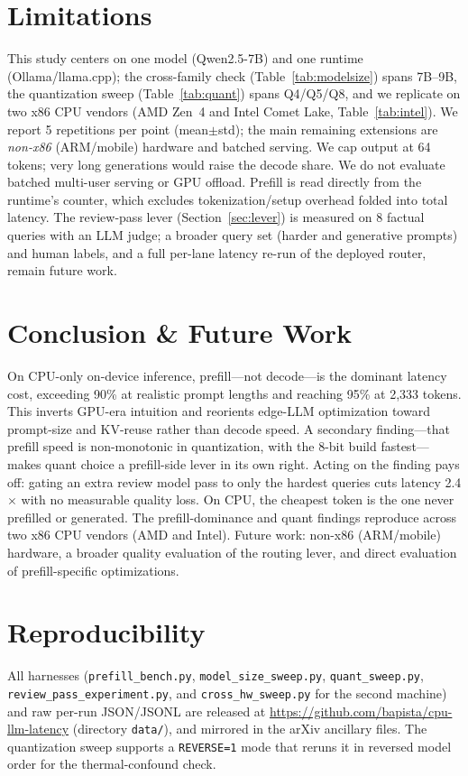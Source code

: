 \documentclass[10pt,twocolumn]{article}
\begin{document}
\section{Limitations}
\label{sec:limitations}
This study centers on one model (Qwen2.5-7B) and one runtime
(Ollama/llama.cpp); the cross-family check (Table~\ref{tab:modelsize}) spans
7B--9B, the quantization sweep (Table~\ref{tab:quant}) spans Q4/Q5/Q8, and we
replicate on two x86 CPU vendors (AMD Zen~4 and Intel Comet Lake,
Table~\ref{tab:intel}). We report 5 repetitions per point (mean$\pm$std); the
main remaining extensions are \emph{non-x86} (ARM/mobile) hardware and
batched serving. We cap
output at 64 tokens; very long generations would
raise the decode share. We do not evaluate batched multi-user serving or
GPU offload. Prefill is read directly from the runtime's counter, which
excludes tokenization/setup overhead folded into total latency. The
review-pass lever (Section~\ref{sec:lever}) is measured on 8 factual
queries with an LLM judge; a broader query set (harder and generative
prompts) and human labels, and a full per-lane latency re-run of the
deployed router, remain future work.

\section{Conclusion \& Future Work}
\label{sec:conclusion}
On CPU-only on-device inference, prefill---not decode---is the dominant
latency cost, exceeding 90\% at realistic prompt lengths and reaching 95\%
at 2{,}333 tokens. This inverts GPU-era intuition and reorients edge-LLM
optimization toward prompt-size and KV-reuse rather than decode speed. A
secondary finding---that prefill speed is non-monotonic in quantization,
with the 8-bit build fastest---makes quant choice a prefill-side lever in
its own right. Acting on the finding pays off: gating an extra review model
pass to only the hardest queries cuts latency 2.4$\times$ with no measurable
quality loss. On CPU, the cheapest token is the one never prefilled or
generated. The prefill-dominance and quant findings reproduce across two x86
CPU vendors (AMD and Intel). Future work: non-x86 (ARM/mobile) hardware, a
broader quality evaluation of the routing lever, and direct evaluation of
prefill-specific optimizations.

\section*{Reproducibility}
\label{sec:repro}
All harnesses (\texttt{prefill\_bench.py}, \texttt{model\_size\_sweep.py},
\texttt{quant\_sweep.py}, \texttt{review\_pass\_experiment.py}, and
\texttt{cross\_hw\_sweep.py} for the second machine) and raw per-run
JSON/JSONL are released at
\url{https://github.com/bapista/cpu-llm-latency} (directory \texttt{data/}),
and mirrored in the arXiv ancillary files. The quantization sweep supports a
\texttt{REVERSE=1} mode that reruns it in reversed model order for the
thermal-confound check.
\end{document}
